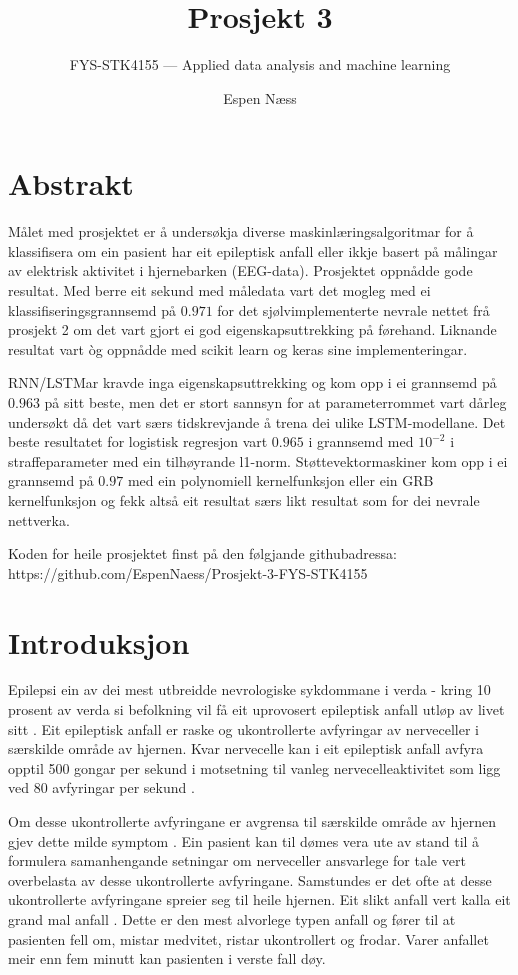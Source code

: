 \documentclass[oneside, nynorsk]{book}
\title{Prosjekt 3}        %
\subtitle{FYS-STK4155 --- Applied data analysis and machine learning}         %
\author{Espen Næss}                      %
\begin{document}
\let\cleardoublepage\clearpage
\ififorside{}
\let\cleardoublepage\clearpage
\chapter*{Abstrakt}                   %
Målet med prosjektet er å undersøkja diverse maskinlæringsalgoritmar for å klassifisera om ein pasient har eit epileptisk anfall eller ikkje
basert på målingar av elektrisk aktivitet i hjernebarken (EEG-data).
Prosjektet oppnådde gode resultat. Med berre eit sekund med måledata vart det mogleg med
ei klassifiseringsgrannsemd på $0.971$ for det sjølvimplementerte nevrale nettet frå prosjekt 2 om det vart gjort ei god eigenskapsuttrekking på førehand. Liknande resultat vart òg oppnådde med scikit learn og keras sine implementeringar.

RNN/LSTMar kravde inga eigenskapsuttrekking og kom opp i ei grannsemd på $0.963$ på sitt beste,
men det er stort sannsyn for at parameterrommet vart dårleg undersøkt då det vart særs tidskrevjande å trena dei ulike LSTM-modellane.
Det beste resultatet for logistisk regresjon vart $0.965$ i grannsemd med $10^{-2}$ i straffeparameter med ein tilhøyrande l1-norm.
Støttevektormaskiner kom opp i ei grannsemd på $0.97$ med ein polynomiell kernelfunksjon eller ein GRB kernelfunksjon og fekk altså eit resultat særs likt resultat som for dei nevrale nettverka.

Koden for heile prosjektet finst på den følgjande githubadressa: \\
https://github.com/EspenNaess/Prosjekt-3-FYS-STK4155
\tableofcontents{}
\mainmatter{}
\chapter{Introduksjon}                    %
Epilepsi ein av dei mest utbreidde nevrologiske sykdommane i verda - kring 10 prosent av verda si befolkning
vil få eit uprovosert epileptisk anfall utløp av livet sitt \cite{Epil}.
Eit epileptisk anfall er raske og ukontrollerte avfyringar av nerveceller i særskilde område av hjernen.
Kvar nervecelle kan i eit epileptisk anfall avfyra opptil 500 gongar per sekund
i motsetning til vanleg nervecelleaktivitet som ligg ved 80 avfyringar per sekund \cite{Epil2}.

Om desse ukontrollerte avfyringane er avgrensa til særskilde område av hjernen gjev dette milde symptom \cite{Epil3}.
Ein pasient kan til dømes vera ute av stand til å formulera samanhengande setningar om nerveceller ansvarlege for tale vert overbelasta av desse ukontrollerte avfyringane.
Samstundes er det ofte at desse ukontrollerte avfyringane spreier seg til heile hjernen.
Eit slikt anfall vert kalla eit grand mal anfall \cite{Epil3}.
Dette er den mest alvorlege typen anfall og fører til at pasienten fell om, mistar medvitet, ristar ukontrollert og frodar.
Varer anfallet meir enn fem minutt kan pasienten i verste fall døy.
\end{document}
